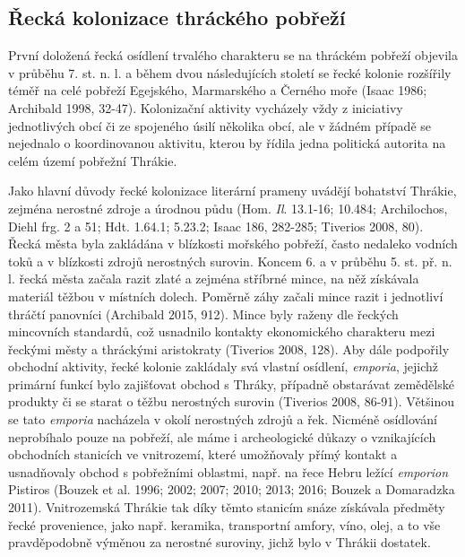 \subsection[řecká-kolonizace-thráckého-pobřeží]{Řecká kolonizace thráckého pobřeží}

První doložená řecká osídlení trvalého charakteru se na thráckém pobřeží objevila v průběhu 7. st. n. l. a během dvou následujících století se řecké kolonie rozšířily téměř na celé pobřeží Egejského, Marmarského a Černého moře (Isaac 1986; Archibald 1998, 32-47). Kolonizační aktivity vycházely vždy z iniciativy jednotlivých obcí či ze spojeného úsilí několika obcí, ale v žádném případě se nejednalo o koordinovanou aktivitu, kterou by řídila jedna politická autorita na celém území pobřežní Thrákie.

Jako hlavní důvody řecké kolonizace literární prameny uvádějí bohatství Thrákie, zejména nerostné zdroje a úrodnou půdu (Hom. {\em Il}. 13.1-16; 10.484; Archilochos, Diehl frg. 2 a 51; Hdt. 1.64.1; 5.23.2; Isaac 186, 282-285; Tiverios 2008, 80). Řecká města byla zakládána v blízkosti mořského pobřeží, často nedaleko vodních toků a v blízkosti zdrojů nerostných surovin. Koncem 6. a v průběhu 5. st. př. n. l. řecká města začala razit zlaté a zejména stříbrné mince, na něž získávala materiál těžbou v místních dolech. Poměrně záhy začali mince razit i jednotliví thráčtí panovníci (Archibald 2015, 912). Mince byly raženy dle řeckých mincovních standardů, což usnadnilo kontakty ekonomického charakteru mezi řeckými městy a thráckými aristokraty (Tiverios 2008, 128). Aby dále podpořily obchodní aktivity, řecké kolonie zakládaly svá vlastní osídlení, {\em emporia}, jejichž primární funkcí bylo zajišťovat obchod s Thráky, případně obstarávat zemědělské produkty či se starat o těžbu nerostných surovin (Tiverios 2008, 86-91). Většinou se tato {\em emporia} nacházela v okolí nerostných zdrojů a řek. Nicméně osídlování neprobíhalo pouze na pobřeží, ale máme i archeologické důkazy o vznikajících obchodních stanicích ve vnitrozemí, které umožňovaly přímý kontakt a usnadňovaly obchod s pobřežními oblastmi, např. na řece Hebru ležící {\em emporion} Pistiros (Bouzek et al. 1996; 2002; 2007; 2010; 2013; 2016; Bouzek a Domaradzka 2011). Vnitrozemská Thrákie tak díky těmto stanicím snáze získávala předměty řecké provenience, jako např. keramika, transportní amfory, víno, olej, a to vše pravděpodobně výměnou za nerostné suroviny, jichž bylo v Thrákii dostatek.

